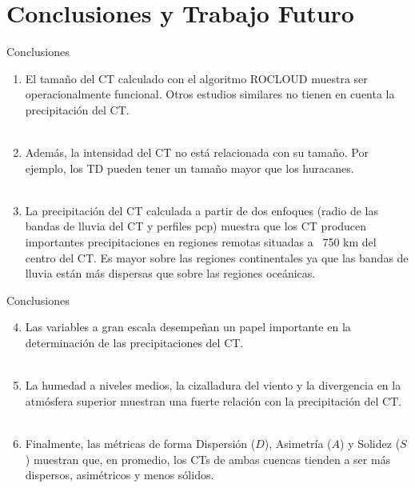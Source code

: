\section{Conclusiones y Trabajo Futuro}
\begin{frame}{Conclusiones}
    \begin{enumerate}
        \item<1-> El tamaño del CT calculado con el algoritmo ROCLOUD muestra ser operacionalmente funcional. Otros estudios similares no tienen en cuenta la precipitación del CT. 
        \\~\
        \item<2-> Además, la intensidad del CT no está relacionada con su tamaño. Por ejemplo, los TD pueden tener un tamaño mayor que los huracanes.
        \\~\
        \item<3-> La precipitación del CT calculada a partir de dos enfoques (radio de las bandas de lluvia del CT y perfiles pcp) muestra que los CT producen importantes precipitaciones en regiones remotas situadas a ~750 km del centro del CT. Es  mayor sobre las regiones continentales ya que las bandas de lluvia están más dispersas que sobre las regiones oceánicas.
    \end{enumerate}
\end{frame}

\begin{frame}{Conclusiones}
    \begin{enumerate}
    \setcounter{enumi}{3}
        \item<1->Las variables a gran escala desempeñan un papel importante en la determinación de las precipitaciones del CT.
        \\~\
        \item<2->La humedad a niveles medios, la cizalladura del viento y la divergencia en la atmósfera superior muestran una fuerte relación con la precipitación del CT. 
        \\~\
        \item<3->Finalmente, las métricas de forma Dispersión ($D$), Asimetría ($A$) y Solidez ($S$) muestran que, en promedio, los CTs de ambas cuencas tienden a ser más dispersos, asimétricos y menos sólidos.
    \end{enumerate}
\end{frame}

